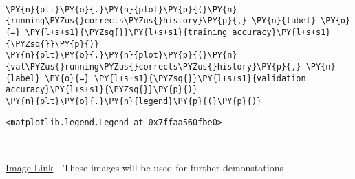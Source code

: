     \begin{center}
    \end{center}
    { \hspace*{\fill} \\}
    
    \begin{tcolorbox}[breakable, size=fbox, boxrule=1pt, pad at break*=1mm,colback=cellbackground, colframe=cellborder]
\begin{Verbatim}[commandchars=\\\{\}]
\PY{n}{plt}\PY{o}{.}\PY{n}{plot}\PY{p}{(}\PY{n}{running\PYZus{}corrects\PYZus{}history}\PY{p}{,} \PY{n}{label} \PY{o}{=} \PY{l+s+s1}{\PYZsq{}}\PY{l+s+s1}{training accuracy}\PY{l+s+s1}{\PYZsq{}}\PY{p}{)}
\PY{n}{plt}\PY{o}{.}\PY{n}{plot}\PY{p}{(}\PY{n}{val\PYZus{}running\PYZus{}corrects\PYZus{}history}\PY{p}{,} \PY{n}{label} \PY{o}{=} \PY{l+s+s1}{\PYZsq{}}\PY{l+s+s1}{validation accuracy}\PY{l+s+s1}{\PYZsq{}}\PY{p}{)}
\PY{n}{plt}\PY{o}{.}\PY{n}{legend}\PY{p}{(}\PY{p}{)}
\end{Verbatim}
\end{tcolorbox}

            \begin{tcolorbox}[breakable, size=fbox, boxrule=.5pt, pad at break*=1mm, opacityfill=0]
\begin{Verbatim}[commandchars=\\\{\}]
<matplotlib.legend.Legend at 0x7ffaa560fbe0>
\end{Verbatim}
\end{tcolorbox}
        
    \begin{center}
    \end{center}
    { \hspace*{\fill} \\}
    
    \href{https://images.homedepot-static.com/productImages/007164ea-d47e-4f66-8d8c-fd9f621984a2/svn/architectural-mailboxes-house-letters-numbers-3585b-5-64_1000.jpg}{Image
Link} - These images will be used for further demonstations

